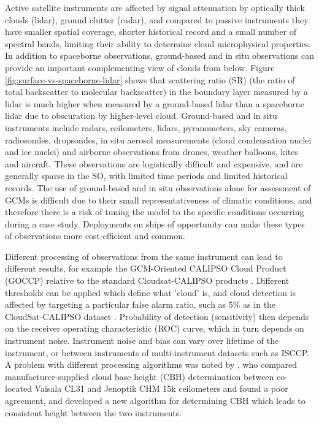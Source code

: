 Active satellite instruments are affected by signal attenuation by
optically thick
clouds (lidar), ground clutter (radar), and compared to passive instruments they have smaller spatial coverage,
shorter historical record and a small number of spectral bands, limiting their
ability to determine cloud microphysical properties.
In addition to spaceborne observations, ground-based and in situ
observations can provide an important complementing view of clouds from below.
Figure \ref{fig:surface-vs-spaceborne-lidar} shows that scattering ratio (SR)
(the ratio of total backscatter to molecular backscatter)
in the boundary layer measured by a lidar is much higher when measured by 
a ground-based lidar than a spaceborne lidar due to obscuration by higher-level
cloud.
Ground-based and in situ instruments include radars, ceilometers, lidars,
pyranometers, sky cameras, radiosondes, dropsondes, in situ aerosol measurements
(cloud condensation nuclei and ice nuclei) and airborne observations from
drones, weather balloons, kites and aircraft. These observations are logistically
difficult and expensive, and are generally sparse in the SO, with
limited time periods and limited historical records. The use of ground-based and
in situ observations alone for assessment of GCMs is difficult due to their
small representativeness of climatic conditions, and therefore there
is a risk of tuning the model to the specific conditions occurring during a
case study. Deployments on ships of opportunity can make these types
of observations more cost-efficient and common.

Different processing of observations from the same instrument can lead
to different results, for example the
GCM-Oriented CALIPSO Cloud Product (GOCCP) relative to the standard
Cloudsat-CALIPSO products \citep{chepfer2010}.
Different thresholds can be applied which define what 'cloud' is,
and cloud detection is affected by targeting a particular false alarm ratio,
such as 5\% as in the CloudSat-CALIPSO dataset \citep{hagihara2010}.
Probability of detection (sensitivity) then depends on the receiver operating
characteristic (ROC) curve, which in turn depends on instrument
noise. Instrument noise and bias can vary over lifetime of the instrument,
or between instruments of multi-instrument datasets such as ISCCP.
A problem with different processing
algorithms was noted by \cite{martucci2010}, who compared
manufacturer-supplied cloud base height (CBH)
determination between co-located Vaisala CL31 and Jenoptik CHM 15k ceilometers
and found a poor agreement, and developed a new algorithm for determining
CBH which leads to consistent height between the two instruments.

